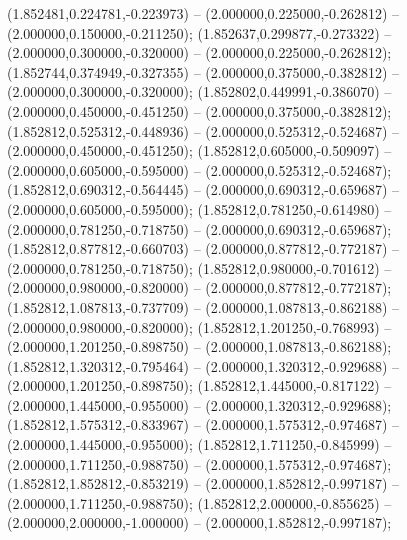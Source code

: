  (1.852481,0.224781,-0.223973) -- (2.000000,0.225000,-0.262812) -- (2.000000,0.150000,-0.211250);
 (1.852637,0.299877,-0.273322) -- (2.000000,0.300000,-0.320000) -- (2.000000,0.225000,-0.262812);
 (1.852744,0.374949,-0.327355) -- (2.000000,0.375000,-0.382812) -- (2.000000,0.300000,-0.320000);
 (1.852802,0.449991,-0.386070) -- (2.000000,0.450000,-0.451250) -- (2.000000,0.375000,-0.382812);
 (1.852812,0.525312,-0.448936) -- (2.000000,0.525312,-0.524687) -- (2.000000,0.450000,-0.451250);
 (1.852812,0.605000,-0.509097) -- (2.000000,0.605000,-0.595000) -- (2.000000,0.525312,-0.524687);
 (1.852812,0.690312,-0.564445) -- (2.000000,0.690312,-0.659687) -- (2.000000,0.605000,-0.595000);
 (1.852812,0.781250,-0.614980) -- (2.000000,0.781250,-0.718750) -- (2.000000,0.690312,-0.659687);
 (1.852812,0.877812,-0.660703) -- (2.000000,0.877812,-0.772187) -- (2.000000,0.781250,-0.718750);
 (1.852812,0.980000,-0.701612) -- (2.000000,0.980000,-0.820000) -- (2.000000,0.877812,-0.772187);
 (1.852812,1.087813,-0.737709) -- (2.000000,1.087813,-0.862188) -- (2.000000,0.980000,-0.820000);
 (1.852812,1.201250,-0.768993) -- (2.000000,1.201250,-0.898750) -- (2.000000,1.087813,-0.862188);
 (1.852812,1.320312,-0.795464) -- (2.000000,1.320312,-0.929688) -- (2.000000,1.201250,-0.898750);
 (1.852812,1.445000,-0.817122) -- (2.000000,1.445000,-0.955000) -- (2.000000,1.320312,-0.929688);
 (1.852812,1.575312,-0.833967) -- (2.000000,1.575312,-0.974687) -- (2.000000,1.445000,-0.955000);
 (1.852812,1.711250,-0.845999) -- (2.000000,1.711250,-0.988750) -- (2.000000,1.575312,-0.974687);
 (1.852812,1.852812,-0.853219) -- (2.000000,1.852812,-0.997187) -- (2.000000,1.711250,-0.988750);
 (1.852812,2.000000,-0.855625) -- (2.000000,2.000000,-1.000000) -- (2.000000,1.852812,-0.997187);
